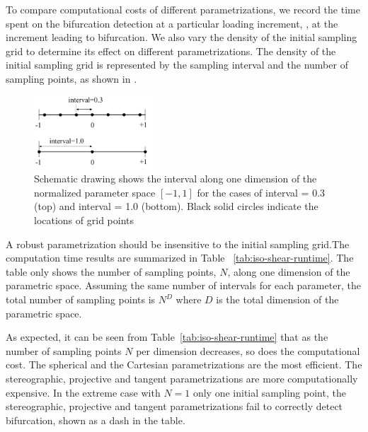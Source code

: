 \documentclass[12pt]{article}
\numberwithin{equation}{section}
\begin{document}
To compare computational costs of different parametrizations, we
record the time spent on the bifurcation detection at a particular
loading increment, \eg, at the increment leading to bifurcation. We
also vary the density of the initial sampling grid to determine its
effect on different parametrizations. The density of the initial sampling grid is represented by the sampling interval and the number of sampling points, as shown in .

\begin{figure}[!htbp]
  \centering 
    \includegraphics[width=0.4\textwidth]
                    {figs/interval_scheme.pdf}
  \caption{Schematic drawing shows the interval along one dimension 
  of the normalized parameter space $[-1, 1]$ for the cases 
  of interval = 0.3 (top) and interval = 1.0 (bottom). Black solid 
  circles indicate the locations of grid points}
  \label{fig:interval_scheme}
\end{figure}

A robust parametrization should be insensitive to the initial 
sampling grid.The computation time results are summarized in Table~
\ref{tab:iso-shear-runtime}. The table only shows the number of 
sampling points, $N$, along one dimension of the parametric space. 
Assuming the same number of intervals for each parameter, the total 
number of sampling points is $N^{D}$ where $D$ is the total dimension 
of the parametric space.

As expected, it can be seen from Table~\ref{tab:iso-shear-runtime}
that as the number of sampling points $N$ per dimension decreases, so
does the computational cost. The spherical and the Cartesian
parametrizations are the most efficient. The stereographic, projective
and tangent parametrizations are more computationally expensive. In
the extreme case with $N=1$ \ie only one initial sampling point, the
stereographic, projective and tangent parametrizations fail to
correctly detect bifurcation, shown as a dash in the table.
\end{document}
